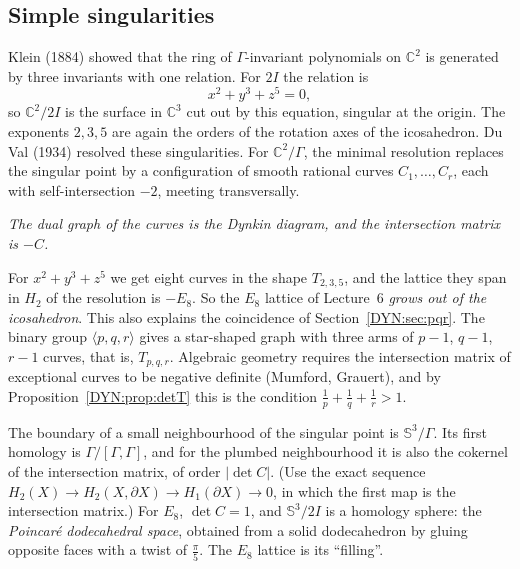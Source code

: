 \documentclass[11pt,openany]{book}
\theoremstyle{plain}
\theoremstyle{definition}
\theoremstyle{remark}
\newcommand{\C}{\mathbb{C}}
\newcommand{\Sph}{\mathbb{S}}          %
\newcommand{\abs}[1]{\left\lvert #1 \right\rvert}
\begin{document}
\subsection*{Simple singularities}
Klein (1884) showed that the ring of $\Gamma$-invariant polynomials on $\C^2$ is generated by three
invariants with one relation. For $2I$ the relation is
\[
  x^2+y^3+z^5=0,
\]
so $\C^2/2I$ is the surface in $\C^3$ cut out by this equation, singular at the origin. The exponents
$2,3,5$ are again the orders of the rotation axes of the icosahedron. Du Val (1934) resolved these
singularities. For $\C^2/\Gamma$, the minimal resolution replaces the singular point by a configuration
of smooth rational curves $C_1,\dots,C_r$, each with self-intersection $-2$, meeting transversally.
\begin{center}
\emph{The dual graph of the curves is the Dynkin diagram, and the intersection matrix is $-C$.}
\end{center}
For $x^2+y^3+z^5$ we get eight curves in the shape $T_{2,3,5}$, and the lattice they span in
$H_2$ of the resolution is $-E_8$. So the $E_8$ lattice of Lecture~6 \emph{grows out of the icosahedron}.
This also explains the coincidence of Section~\ref{DYN:sec:pqr}. The binary group $\langle p,q,r\rangle$
gives a star-shaped graph with three arms of $p-1$, $q-1$, $r-1$ curves, that is, $T_{p,q,r}$. Algebraic geometry
requires the intersection matrix of exceptional curves to be negative definite (Mumford, Grauert), and
by Proposition~\ref{DYN:prop:detT} this is the condition $\frac1p+\frac1q+\frac1r>1$.

The boundary of a small neighbourhood of the singular point is $\Sph^3/\Gamma$. Its first homology is
$\Gamma/[\Gamma,\Gamma]$, and for the plumbed neighbourhood it is also the cokernel of the intersection
matrix, of order $\abs{\det C}$. (Use the exact sequence $H_2(X)\to H_2(X,\partial X)\to H_1(\partial X)\to0$,
in which the first map is the intersection matrix.) For $E_8$, $\det C=1$, and $\Sph^3/2I$ is a homology
sphere: the \emph{Poincar\'e dodecahedral space}, obtained from a solid dodecahedron by gluing opposite
faces with a twist of $\frac\pi5$. The $E_8$ lattice is its ``filling''.
\end{document}
